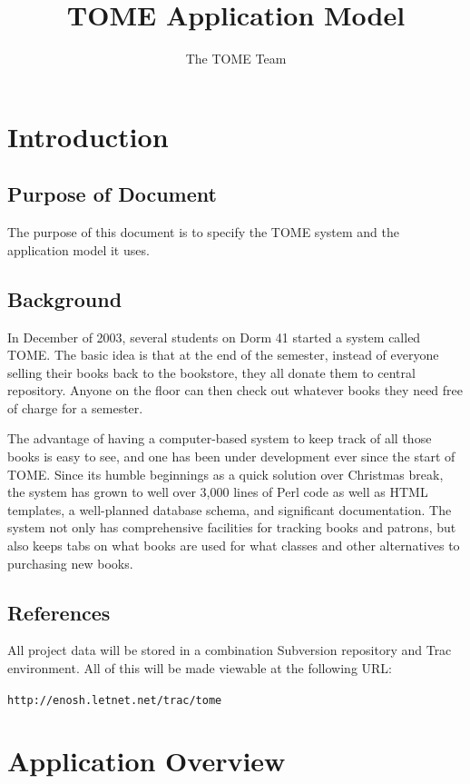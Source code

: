 \documentclass[12pt,titlepage]{article}
\author{The TOME Team}
\title{\textbf{TOME Application Model}}
\begin{document}
\maketitle
\tableofcontents
\listoffigures
\newpage
\section{Introduction}
\subsection{Purpose of Document}
The purpose of this document is to specify the TOME system and the application model it uses.
\subsection{Background}
In December of 2003, several students on Dorm 41 started a system called TOME.  The basic idea is that at the end of the semester, instead of everyone selling their books back to the bookstore, they all donate them to central repository.  Anyone on the floor can then check out whatever books they need free of charge for a semester.

The advantage of having a computer-based system to keep track of all those books is easy to see, and one has been under development ever since the start of TOME.  Since its humble beginnings as a quick solution over Christmas break, the system has grown to well over 3,000 lines of Perl code as well as HTML templates, a well-planned database schema, and significant documentation.  The system not only has comprehensive facilities for tracking books and patrons, but also keeps tabs on what books are used for what classes and other alternatives to purchasing new books.
\subsection{References}
All project data will be stored in a combination Subversion repository and Trac environment.  All of this will be made viewable at the following URL:

\texttt{http://enosh.letnet.net/trac/tome}
\section{Application Overview}
\end{document}
